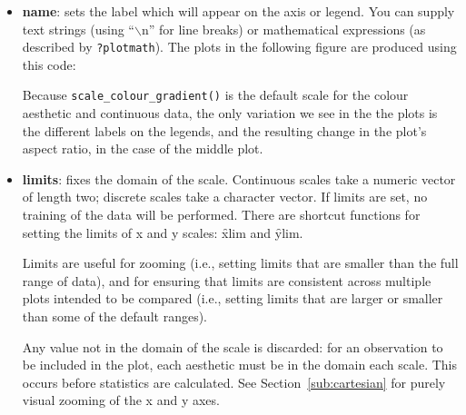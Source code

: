 \begin{itemize}
  \item {\bf name}:  sets the label which will appear on the axis or legend. You can supply text strings (using ``$\backslash$n'' for line breaks) or mathematical expressions (as described by \verb|?plotmath|).  The plots in the following figure are produced using this code:

    

  Because {\tt scale\_colour\_gradient()} is the default scale for the colour aesthetic and continuous data, the only variation we see in the the plots is the different labels on the legends, and the resulting change in the plot's aspect ratio, in the case of the middle plot.

    

  \item {\bf limits}: fixes the domain of the scale.   Continuous scales take a numeric vector of length two; discrete scales take a character vector. If limits are set, no training of the data will be performed.  There are shortcut functions for setting the limits of x and y scales: \f{xlim} and \f{ylim}.  
  
  Limits are useful for zooming (i.e., setting limits that are smaller than the full range of data), and for ensuring that limits are consistent across multiple plots intended to be compared (i.e., setting limits that are larger or smaller than some of the default ranges).  
  
  Any value not in the domain of the scale is discarded: for an observation to be included in the plot, each aesthetic must be in the domain each scale.  This occurs before statistics are calculated. See Section~\ref{sub:cartesian} for purely visual zooming of the x and y axes.


\end{itemize}
